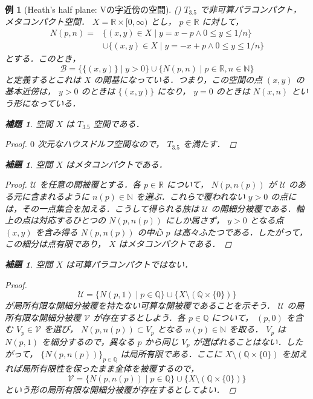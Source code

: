 \documentclass[leqno, 12pt]{ltjsarticle}
\newtheorem{lem}[thm]{補題}
\newtheorem{exam}[thm]{例}
\newcommand{\nn}{\mathbb{N}}
\renewcommand{\qq}{\mathbb{Q}}
\newcommand{\rr}{\mathbb{R}}
\begin{document}
\begin{exam}[Heath's half plane: Vの字近傍の空間](\cite{H})
$T_{3.5}$
で非可算パラコンパクト，メタコンパクト空間．
$X=\rr\times [0,\infty)$
とし，
$p\in \rr$
に対して，
\[
\begin{aligned}
N(p,n)={}&\{(x,y)\in X \mid y=x-p\land 0\le y\le 1/n\}\\
&\cup\{(x,y)\in X \mid y=-x+p\land 0\le y\le 1/n\}
\end{aligned}
\]
とする．このとき，
\[
\mathcal{B}=\{\{(x,y)\} \mid y>0\}\cup\{N(p, n) \mid p\in \rr, n\in \nn\}
\]
と定義するとこれは
$X$
の開基になっている．つまり，この空間の点
$(x,y)$
の基本近傍は，
$y>0$
のときは
$\{(x,y)\}$
になり，
$y=0$
のときは
$N(x,n)$
という形になっている．
\begin{lem}
空間
$X$
は
$T_{3.5}$
空間である．
\end{lem}
\begin{proof}
$0$
次元なハウスドルフ空間なので，
$T_{3.5}$
を満たす．
\end{proof}
\begin{lem}
空間
$X$
はメタコンパクトである．
\end{lem}
\begin{proof}
$\mathcal{U}$
を任意の開被覆とする．各
$p\in\rr$
について，
$N(p,n(p))$
が
$\mathcal{U}$
のある元に含まれるように
$n(p)\in\nn$
を選ぶ．これらで覆われない
$y>0$
の点には，その一点集合を加える．こうして得られる族は
$\mathcal{U}$
の開細分被覆である．軸上の点は対応するひとつの
$N(p,n(p))$
にしか属さず，
$y>0$
となる点
$(x,y)$
を含み得る
$N(p,n(p))$
の中心
$p$
は高々ふたつである．したがって，この細分は点有限であり，
$X$
はメタコンパクトである．
\end{proof}
\begin{lem}
空間
$X$
は可算パラコンパクトではない．
\end{lem}
\begin{proof}
\[
\mathcal{U}=\{N(p,1) \mid p\in \qq\}\cup \{X\setminus (\qq\times \{0\})\}
\]
が局所有限な開細分被覆を持たない可算な開被覆であることを示そう．
$\mathcal{U}$
の局所有限な開細分被覆
$\mathcal{V}$
が存在するとしよう．各
$p\in\qq$
について，
$(p,0)$
を含む
$V_{p}\in\mathcal{V}$
を選び，
$N(p,n(p))\subset V_{p}$
となる
$n(p)\in\nn$
を取る．
$V_{p}$
は
$N(p,1)$
を細分するので，異なる
$p$
から同じ
$V_{p}$
が選ばれることはない．したがって，
$\{N(p,n(p))\}_{p\in\qq}$
は局所有限である．ここに
$X\setminus(\qq\times\{0\})$
を加えれば局所有限性を保ったまま全体を被覆するので，
\[
\mathcal{V}=\{N(p,n(p)) \mid p\in \qq\}\cup \{X\setminus (\qq\times \{0\})\}
\]
という形の局所有限な開細分被覆が存在するとしてよい．


\end{proof}
\end{exam}
\end{document}
